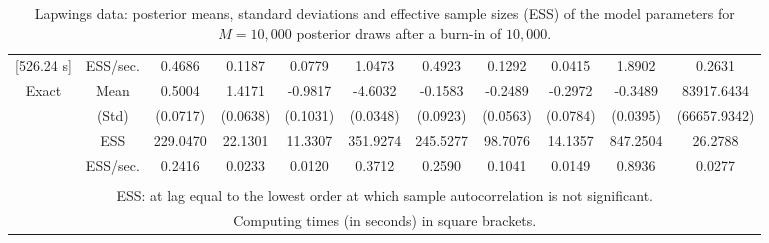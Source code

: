 {{\begin{table}
\begin{tabular}{cc ccc ccc ccc}
[526.24 s]  & ESS/sec. 
 & 0.4686  & 0.1187  & 0.0779  & 1.0473  & 0.4923  & 0.1292  & 0.0415  & 1.8902  & 0.2631  \\  [1.3ex] 
\rowcolor{LightCyan} Exact & Mean 
 & 0.5004  & 1.4171  & -0.9817  & -4.6032  & -0.1583  & -0.2489  & -0.2972  & -0.3489  & 83917.6434  \\  [0.75ex] 
 & (Std) 
 & (0.0717)  & (0.0638)  & (0.1031)  & (0.0348)  & (0.0923)  & (0.0563)  & (0.0784)  & (0.0395)  & (66657.9342)  \\  [0.75ex] 
 & ESS 
 & 229.0470  & 22.1301  & 11.3307  & 351.9274  & 245.5277  & 98.7076  & 14.1357  & 847.2504  & 26.2788  \\  [0.75ex] 
[948.12 s]  & ESS/sec. 
 & 0.2416  & 0.0233  & 0.0120  & 0.3712  & 0.2590  & 0.1041  & 0.0149  & 0.8936  & 0.0277  \\  [1.3ex] 
 \\  \hline 
\multicolumn{11}{p{11cm}}{\footnotesize{ESS: at lag equal to the lowest order at which sample autocorrelation is not significant.}}  \\ 
\multicolumn{11}{p{11cm}}{\footnotesize{Computing times  (in seconds) in square brackets.}}  \\ 
\end{tabular}
\caption{Lapwings data: posterior means, standard deviations and effective sample sizes (ESS) of the model parameters for $M=10,000$ posterior draws after a burn-in of $10,000$.}
\label{tab:BKM_theta_1}  
\end{table}
}} \normalsize